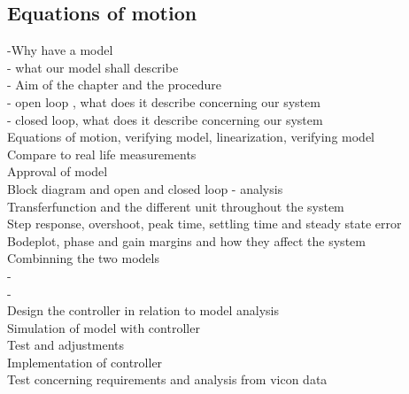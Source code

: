 \subsection{Equations of motion}
-Why have a model \\
- what our model shall describe\\
- Aim of the chapter and the procedure\\


- open loop , what does it describe concerning our system\\
- closed loop, what does it describe concerning our system\\

Equations of motion, verifying model, linearization, verifying model\\
Compare to real life measurements\\
Approval of model\\
Block diagram and open and closed loop - analysis \\
Transferfunction and the different unit throughout the system\\
Step response, overshoot, peak time, settling time and steady state error\\
Bodeplot, phase and gain margins and how they affect the system\\
Combinning the two models\\
-\\
-\\
Design the controller in relation to model analysis\\
Simulation of model with controller\\
Test and adjustments\\

Implementation of controller\\
Test concerning requirements and analysis from vicon data\\\\\\\\


